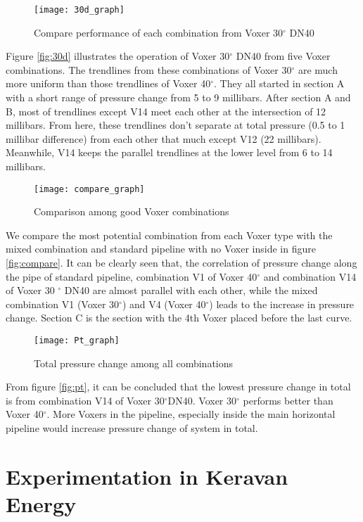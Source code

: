 \begin{figure}[h]
  \centering
  \texttt{[image: 30d\_graph]}
  \caption{Compare performance of each combination from Voxer 30$^{\circ}$ DN40}
  \label{fig:30d}
\end{figure}

Figure \vref{fig:30d} illustrates the operation of Voxer 30$^{\circ}$ DN40 from five Voxer combinations. The trendlines from these combinations of Voxer 30$^{\circ}$ are much more uniform than those trendlines of Voxer 40$^{\circ}$. They all started in section A with a short range of pressure change from 5 to 9 millibars. After section A and B, most of trendlines except V14 meet each other at the intersection of 12 millibars. From here, these trendlines don't separate at total pressure (0.5 to 1 millibar difference) from each other that much except V12 (22 millibars). Meanwhile, V14 keeps the parallel trendlines at the lower level from 6 to 14 millibars.

\begin{figure}[h]
  \centering
  \texttt{[image: compare\_graph]}
  \caption{ Comparison among good Voxer combinations }
  \label{fig:compare}
\end{figure}

We compare the most potential combination from each Voxer type with the mixed combination and standard pipeline with no Voxer inside in figure \vref{fig:compare}. It can be clearly seen that, the correlation of pressure change along the pipe of standard pipeline, combination V1 of Voxer 40$^{\circ}$ and combination V14 of Voxer 30 $^{\circ}$ DN40 are almost parallel with each other, while the mixed combination V1 (Voxer 30$^{\circ}$) and V4 (Voxer 40$^{\circ}$) leads to the increase in pressure change. Section C is the section with the 4th Voxer placed before the last curve.

\begin{figure}[h]
  \centering
  \texttt{[image: Pt\_graph]}
  \caption{ Total pressure change among all combinations}
  \label{fig:pt}
\end{figure}

From figure \vref{fig:pt}, it can be concluded that the lowest pressure change in total is from combination V14 of Voxer 30$^{\circ}$DN40. Voxer 30$^{\circ}$ performs better than Voxer 40$^{\circ}$. More Voxers in the pipeline, especially inside the main horizontal pipeline would increase pressure change of system in total.  

\section{Experimentation in Keravan Energy}

